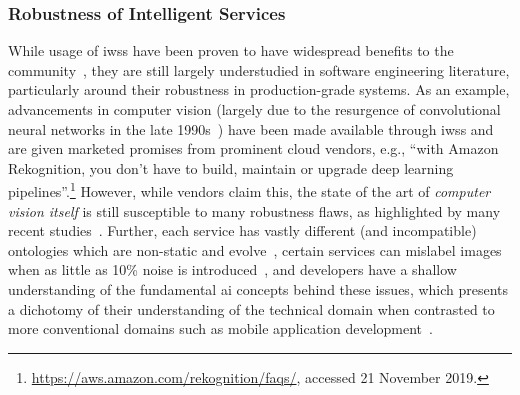 

\subsubsection{Robustness of Intelligent Services}
While usage of \glspl{iws} have been proven to have widespread benefits to the community~\citep{Reis:2018cp,daMotaSilveira:2017vp}, they are still largely understudied in software engineering literature, particularly around their robustness in production-grade systems. As an example, advancements in computer vision (largely due to the resurgence of convolutional neural networks in the late 1990s~\citep{Lecun:1998hy}) have been made available through \glspl{iws} and are given marketed promises from prominent cloud vendors, e.g., ``with Amazon Rekognition, you don’t have to build, maintain or upgrade deep learning pipelines''.\footnote{\url{https://aws.amazon.com/rekognition/faqs/}, accessed 21 November 2019.} However, while vendors claim this, the state of the art of \textit{computer vision itself} is still susceptible to many robustness flaws, as highlighted by many recent studies~\citep{Eykholt:2018vk,Wang:2018vl,Rosenfeld:2018ut}. Further, each service has vastly different (and incompatible) ontologies which are non-static and evolve~\citep{Cummaudo:2019icsme,Ohtake:2019vi}, certain services can mislabel images when as little as 10\% noise is introduced~\citep{Hosseini:2018jr}, and developers have a shallow understanding of the fundamental \gls{ai} concepts behind these issues, which presents a dichotomy of their understanding of the technical domain when contrasted to more conventional domains such as mobile application development~\citep{Cummaudo:2020icse}.


